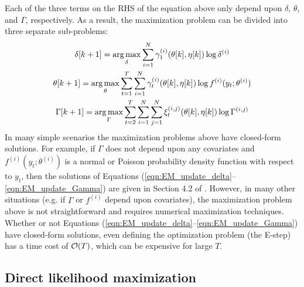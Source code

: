 Each of the three terms on the RHS of the equation above only depend upon $\delta$, $\theta$, and $\Gamma$, respectively. As a result, the maximization problem can be divided into three separate sub-problems:
%
\begin{gather}
    \delta[k+1] = \operatorname*{arg\,max}_{\delta} \sum_{i=1}^N \gamma^{(i)}_1(\theta[k],\eta[k]) \log \delta^{(i)} \label{eqn:EM_update_delta} \\
    \theta[k+1] = \operatorname*{arg\,max}_{\theta} \sum_{t = 1}^T \sum_{i=1}^N \gamma^{(i)}_t(\theta[k],\eta[k]) \log f^{(i)}(y_t;\theta^{(i)}) \label{eqn:EM_update_theta} \\
    \Gamma[k+1] = \operatorname*{arg\,max}_{\Gamma} \sum_{t=2}^{T} \sum_{i=1}^N \sum_{j=1}^N \xi_t^{(i,j)}(\theta[k],\eta[k]) \log \Gamma^{(i,j)} \label{eqn:EM_update_Gamma}
\end{gather}
%
In many simple scenarios the maximization problems above have closed-form solutions. For example, if $\Gamma$ does not depend upon any covariates and $f^{(i)}(y_t;\theta^{(i)})$ is a normal or Poisson probability density function with respect to $y_t$, then the solutions of Equations (\ref{eqn:EM_update_delta}--\ref{eqn:EM_update_Gamma}) are given in Section 4.2 of \citet{Zucchini:2016}. However, in many other situations (e.g. if $\Gamma$ or $f^{(i)}$ depend upon covariates), the maximization problem above is not straightforward and requires numerical maximization techniques. Whether or not Equations (\ref{eqn:EM_update_delta}--\ref{eqn:EM_update_Gamma}) have closed-form solutions, even defining the optimization problem (the E-step) has a time cost of $\mathcal{O}(T)$, which can be expensive for large $T$. 

\subsection{Direct likelihood maximization}

